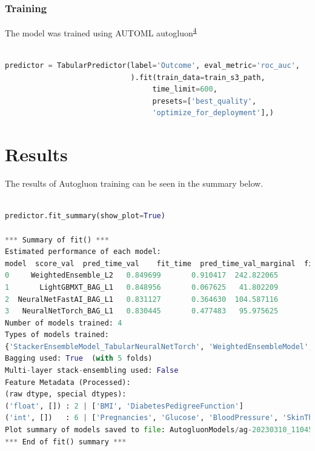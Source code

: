 \documentclass[
]{article}
\begin{document}
\hypertarget{training}{%
\subsubsection{Training}\label{training}}

The model was trained using AUTOML
autogluon\textsuperscript{\protect\hyperlink{ref-auto}{4}}

\begin{lstlisting}[language=python]
%%time

predictor = TabularPredictor(label='Outcome', eval_metric='roc_auc',
                             ).fit(train_data=train_s3_path,
                                  time_limit=600,
                                  presets=['best_quality',
                                  'optimize_for_deployment'],)
\end{lstlisting}

\hypertarget{results}{%
\section{Results}\label{results}}

The results of Autogluon training can be seen in the summary below.

\begin{lstlisting}[language=python]

predictor.fit_summary(show_plot=True)

*** Summary of fit() ***
Estimated performance of each model:
model  score_val  pred_time_val    fit_time  pred_time_val_marginal  fit_time_marginal  stack_level  can_infer  fit_order
0     WeightedEnsemble_L2   0.849699       0.910417  242.822065                0.000679           0.457114            2       True          4
1       LightGBMXT_BAG_L1   0.848956       0.067625   41.802209                0.067625          41.802209            1       True          1
2  NeuralNetFastAI_BAG_L1   0.831127       0.364630  104.587116                0.364630         104.587116            1       True          2
3   NeuralNetTorch_BAG_L1   0.830445       0.477483   95.975625                0.477483          95.975625            1       True          3
Number of models trained: 4
Types of models trained:
{'StackerEnsembleModel_TabularNeuralNetTorch', 'WeightedEnsembleModel', 'StackerEnsembleModel_NNFastAiTabular', 'StackerEnsembleModel_LGB'}
Bagging used: True  (with 5 folds)
Multi-layer stack-ensembling used: False 
Feature Metadata (Processed):
(raw dtype, special dtypes):
('float', []) : 2 | ['BMI', 'DiabetesPedigreeFunction']
('int', [])   : 6 | ['Pregnancies', 'Glucose', 'BloodPressure', 'SkinThickness', 'Insulin', ...]
Plot summary of models saved to file: AutogluonModels/ag-20230310_110459/SummaryOfModels.html
*** End of fit() summary ***

\end{lstlisting}
\end{document}
